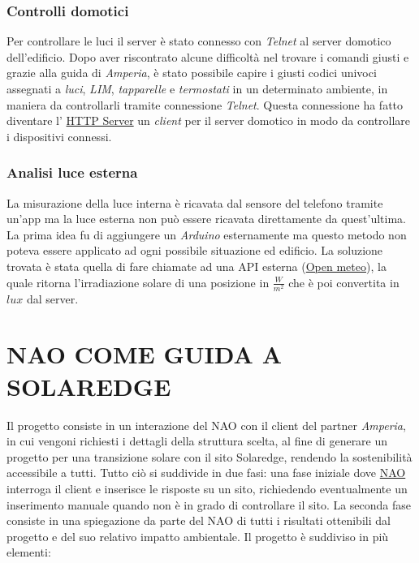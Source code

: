\documentclass{optica-article}
\begin{document}
\vspace{8pt}
\subsubsection{Controlli domotici}\label{sec:domotics_domotics_server}
Per controllare le luci il server è stato connesso con \emph{Telnet} al server domotico dell'edificio. Dopo aver riscontrato alcune difficoltà nel trovare i comandi giusti e grazie alla guida di \emph{Amperia}, è stato possibile capire i giusti codici univoci assegnati a \emph{luci}, \emph{LIM}, \emph{tapparelle} e \emph{termostati} in un determinato ambiente, in maniera da controllarli tramite connessione \emph{Telnet}. Questa connessione ha fatto diventare l' \hyperref[sec:domotics_server]{HTTP Server} un \emph{client} per il server domotico in modo da controllare i dispositivi connessi.

\vspace{8pt}
\subsubsection{Analisi luce esterna}
La misurazione della luce interna è ricavata dal sensore del telefono tramite un'app ma la luce esterna non può essere ricavata direttamente da quest'ultima. La prima idea fu di aggiungere un \emph{Arduino} esternamente ma questo metodo non poteva essere applicato ad ogni possibile situazione ed edificio. La soluzione trovata è stata quella di fare chiamate ad una API esterna (\href{https://open-meteo.com/}{Open meteo}), la quale ritorna l'irradiazione solare di una posizione in $\frac{W}{m^2}$ che è poi convertita in $lux$ dal server.

\bigskip 
\section{NAO COME GUIDA A SOLAREDGE}\label{sec:solaredge_project}

Il progetto consiste in un interazione del NAO con il client del partner \emph{Amperia}, in cui vengoni richiesti i dettagli della struttura scelta, al fine di generare un progetto per una transizione solare con il sito Solaredge, rendendo la sostenibilità accessibile a tutti. Tutto ciò si suddivide in due fasi: una fase iniziale dove \hyperref[sec:solaredge_nao]{NAO} interroga il client e inserisce le risposte su un sito, richiedendo eventualmente un inserimento manuale quando non è in grado di controllare il sito. La seconda fase consiste in una spiegazione da parte del NAO di tutti i risultati ottenibili dal progetto e del suo relativo impatto ambientale. Il progetto è suddiviso in più elementi:\\
\end{document}
